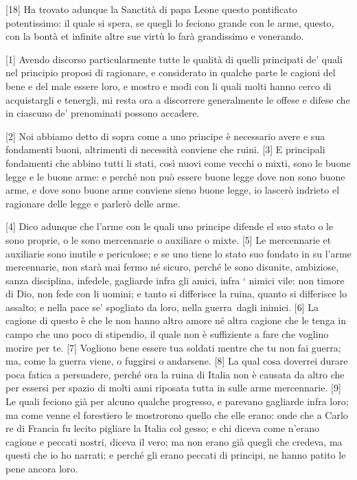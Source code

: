 {[}18{]} Ha trovato adunque la
Sanctità di papa Leone questo pontificato potentissimo: il quale si
spera, se quegli lo feciono grande con le arme, questo, con la bontà et
infinite altre sue virtù lo farà grandissimo e venerando.


{[}1{]} Avendo discorso particularmente tutte le qualità di quelli
principati de' quali nel principio proposi di ragionare, e considerato
in qualche parte le cagioni del bene e del male essere loro, e mostro e
modi con li quali molti hanno cerco di acquistargli e tenergli, mi resta
ora a discorrere generalmente le offese e difese che in ciascuno de'
prenominati possono accadere.

{[}2{]} Noi abbiamo detto di sopra come a uno principe è necessario
avere e sua fondamenti buoni, altrimenti di necessità conviene che
ruini. {[}3{]} E principali fondamenti che abbino tutti li stati, così
nuovi come vecchi o mixti, sono le buone legge e le buone arme: e perché
non può essere buone legge dove non sono buone arme, e dove sono buone
arme conviene sieno buone legge, io lascerò indrieto el ragionare delle
legge e parlerò delle arme.

{[}4{]} Dico adunque che l'arme con le quali uno principe difende el suo
stato o le sono proprie, o le sono mercennarie o auxiliare o mixte.
{[}5{]} Le mercennarie et auxiliarie sono inutile e periculose; e se uno
tiene lo stato suo fondato in su l'arme mercennarie, non starà mai fermo
né sicuro, perché le sono disunite, ambiziose, sanza disciplina,
infedele, gagliarde infra gli amici, infra ` nimici vile: non timore di
Dio, non fede con li uomini; e tanto si differisce la ruina, quanto si
differisce lo assalto; e nella pace se' spogliato da loro, nella guerra\est\
dagli inimici. {[}6{]} La cagione di questo è che le non hanno altro
amore né altra cagione che le tenga in campo che uno poco di stipendio,
il quale non è suffiziente a fare che voglino morire per te. {[}7{]}
Vogliono bene essere tua soldati mentre che tu non fai guerra; ma, come
la guerra viene, o fuggirsi o andarsene. {[}8{]} La qual cosa doverrei
durare poca fatica a persuadere, perché ora la ruina di Italia non è
causata da altro che per essersi per spazio di molti anni riposata tutta
in sulle arme mercennarie. {[}9{]} Le quali feciono già per alcuno
qualche progresso, e parevano gagliarde infra loro; ma come venne el
forestiero le mostrorono quello che elle erano: onde che a Carlo re di
Francia fu lecito pigliare la Italia col gesso; e chi diceva come
n'erano cagione e peccati nostri, diceva il vero; ma non erano già
quegli che credeva, ma questi che io ho narrati; e perché gli erano
peccati di principi, ne hanno patito le pene ancora loro.

